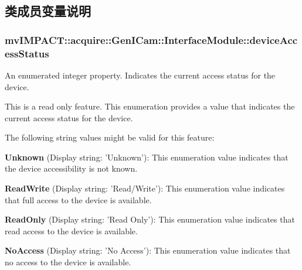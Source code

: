 \subsection{类成员变量说明}
\hypertarget{classmv_i_m_p_a_c_t_1_1acquire_1_1_gen_i_cam_1_1_interface_module_a4017b5d454159033952261c47af7ac2d}{
\subsubsection[{device\+Access\+Status}]{ mv\+I\+M\+P\+A\+C\+T\+::acquire\+::\+Gen\+I\+Cam\+::\+Interface\+Module\+::device\+Access\+Status}}\label{classmv_i_m_p_a_c_t_1_1acquire_1_1_gen_i_cam_1_1_interface_module_a4017b5d454159033952261c47af7ac2d}


An enumerated integer property. Indicates the current access status for the device. 

This is a read only feature. This enumeration provides a value that indicates the current access status for the device.

The following string values might be valid for this feature\+:
\begin{DoxyItemize}
\item {\bfseries Unknown} (Display string\+: 'Unknown')\+: This enumeration value indicates that the device accessibility is not known.
\item {\bfseries Read\+Write} (Display string\+: 'Read/\+Write')\+: This enumeration value indicates that full access to the device is available.
\item {\bfseries Read\+Only} (Display string\+: 'Read Only')\+: This enumeration value indicates that read access to the device is available.
\item {\bfseries No\+Access} (Display string\+: 'No Access')\+: This enumeration value indicates that no access to the device is available.
\end{DoxyItemize}

